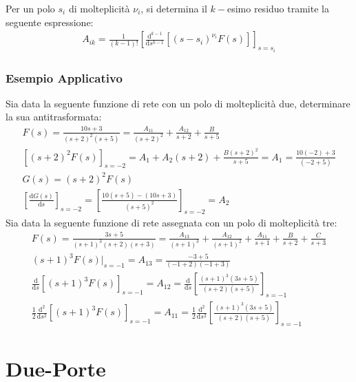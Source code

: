 \documentclass{article}
\newcommand{\df}{\mathrm{d}}
\numberwithin{equation}{subsection}
\begin{document}
Per un polo $s_i$ di molteplicità $\nu_i$, si determina il $k-$esimo residuo tramite la seguente espressione:
\begin{gather}
    A_{ik}=\displaystyle\frac{1}{(k-1)!}\left[\frac{\df^{k-1}}{\df s^{k-1}}\left[(s-s_i)^{\nu_i}F(s)\right]\right]_{s=s_i}
\end{gather}

\subsubsection{Esempio Applicativo}

Sia data la seguente funzione di rete con un polo di molteplicità due, determinare la sua antitrasformata: 
\begin{gather*}
    F(s)=\displaystyle\frac{10s+3}{(s+2)^2(s+5)}=\frac{A_{11}}{(s+2)^2}+\frac{A_{12}}{s+2}+\frac{B}{s+5}\\
    \left[(s+2)^2F(s)\right]_{s=-2}=A_1+A_2(s+2)+\displaystyle\frac{B(s+2)^2}{s+5}=A_1=\frac{10(-2)+3}{(-2+5)}\\
    G(s)=(s+2)^2F(s)\\
    \displaystyle\left[\frac{\df G(s)}{\df s}\right]_{s=-2}=\left[\frac{10(s+5)-(10s+3)}{(s+5)^2}\right]_{s=-2}=A_2
\end{gather*}
Sia data la seguente funzione di rete assegnata con un polo di molteplicità tre:
\begin{gather*}
    F(s)=\displaystyle\frac{3s+5}{(s+1)^3(s+2)(s+3)}=\frac{A_{13}}{(s+1)^3}+\frac{A_{12}}{(s+1)^2}+\frac{A_{11}}{s+1}+\frac{B}{s+2}+\frac{C}{s+3}\\
    (s+1)^3F(s)\bigg|_{s=-1}=A_{13}=\displaystyle\frac{-3+5}{(-1+2)(-1+3)}\\
    \displaystyle\frac{\df}{\df s}\left[(s+1)^3F(s)\right]_{s=-1}=A_{12}=\frac{\df}{\df s}\left[\frac{(s+1)^3(3s+5)}{(s+2)(s+5)}\right]_{s=-1}\\
    \frac{1}{2}\displaystyle\frac{\df^2}{\df s^2}\left[(s+1)^3F(s)\right]_{s=-1}=A_{11}=\frac{1}{2}\frac{\df^2}{\df s^2}\left[\frac{(s+1)^3(3s+5)}{(s+2)(s+5)}\right]_{s=-1}
\end{gather*}

\clearpage

\section{Due-Porte}
\end{document}
